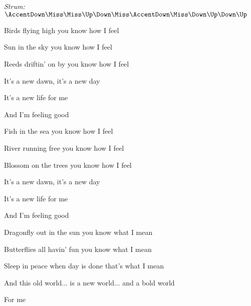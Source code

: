 \begin{song}


\begin{headerbox}
\RaiseBoxWithAccents
{} \quad
\textit{Strum:} $\AccentDown\Miss\Miss\Up\Down\Miss\AccentDown\Miss\Down\Up\Down\Up$
\end{headerbox}

\begin{hchordbox}
\end{hchordbox}

\Large

\bigskip

\Intro {}    \par

\bigskip

 Birds flying high  you know how I feel \par
{} Sun in the sky  you know how I feel \par
{}Reeds driftin' on by  you know how I feel \par
It's a new dawn, it's a new day \par
It's a new life  for me  \par
And I'm feeling good    \par

\bigskip

 Fish in the sea  you know how I feel \par
{} River running free  you know how I feel \par
{} Blossom on the trees  you know how I feel \par
It's a new dawn, it's a new day \par
It's a new life  for me  \par
And I'm feeling good    \par

\bigskip

 Dragonfly out in the sun  you know what I mean \par %
{} Butterflies all havin' fun  you know what I mean \par
{} Sleep in peace when day is done  that's what I mean \par
And this old world... is a new world... and a bold world  \par
For me    \par


\end{song}
